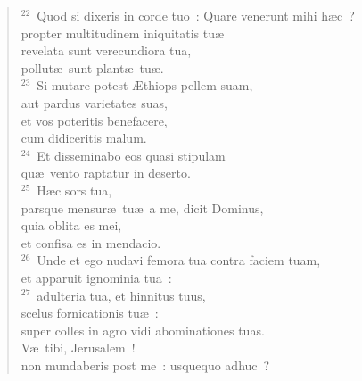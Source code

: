 \begin{verse}
${}^{22}$~Quod si dixeris in corde tuo~: Quare venerunt mihi h\ae c~?\\ propter multitudinem iniquitatis tu\ae \\ revelata sunt verecundiora tua,\\ pollut\ae\ sunt plant\ae\ tu\ae .\\
${}^{23}$~Si mutare potest \AE thiops pellem suam,\\ aut pardus varietates suas,\\ et vos poteritis benefacere,\\ cum didiceritis malum.\\
${}^{24}$~Et disseminabo eos quasi stipulam\\ qu\ae\ vento raptatur in deserto.\\
${}^{25}$~H\ae c sors tua,\\ parsque mensur\ae\ tu\ae\ a me, dicit Dominus,\\ quia oblita es mei,\\ et confisa es in mendacio.\\
${}^{26}$~Unde et ego nudavi femora tua contra faciem tuam,\\ et apparuit ignominia tua~:\\
${}^{27}$~adulteria tua, et hinnitus tuus,\\ scelus fornicationis tu\ae~:\\ super colles in agro vidi abominationes tuas.\\ V\ae\ tibi, Jerusalem~!\\ non mundaberis post me~: usquequo adhuc~?\end{verse}



